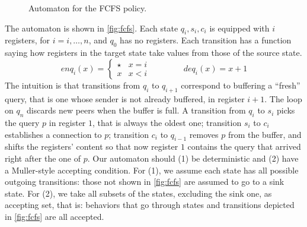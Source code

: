 \begin{figure}[t]
\caption{Automaton for the FCFS policy.}
\label{fig:fcfs}
\end{figure}
%
The automaton is shown in \autoref{fig:fcfs}. Each state $q_i,s_i,c_i$ is equipped with $i$ registers, for $i=i,\dots,n$, and $q_0$ has no registers. Each transition has a function saying how registers in the target state take values from those of the source state.
\[
	enq_i(x) = 
	\begin{cases}
		\star & x = i \\
		x & x < i
	\end{cases}
	\qquad
	\qquad
	deq_i(x) = x + 1
\]
%
The intuition is that transitions from $q_i$ to $q_{i+1}$ correspond to buffering a ``fresh'' query, that is one whose sender is not already buffered, in register $i+1$. The loop on $q_n$ discards new peers when the buffer is full. A transition from $q_i$ to $s_i$ picks the query $p$ in register $1$, that is always the oldest one; transition $s_i$ to $c_i$ establishes a connection to $p$; transition $c_i$ to $q_{i-1}$ removes $p$ from the buffer, and shifts the registers' content so that now register $1$ contains the query that arrived right after the one of $p$. Our automaton should (1) be deterministic and (2) have a Muller-style accepting condition. For (1), we assume each state has all possible outgoing transitions: those not shown in \autoref{fig:fcfs} are assumed to go to a sink state. For (2), we take all subsets of the states, excluding the sink one, as accepting set, that is: behaviors that go through states and transitions depicted in \autoref{fig:fcfs} are all accepted.

